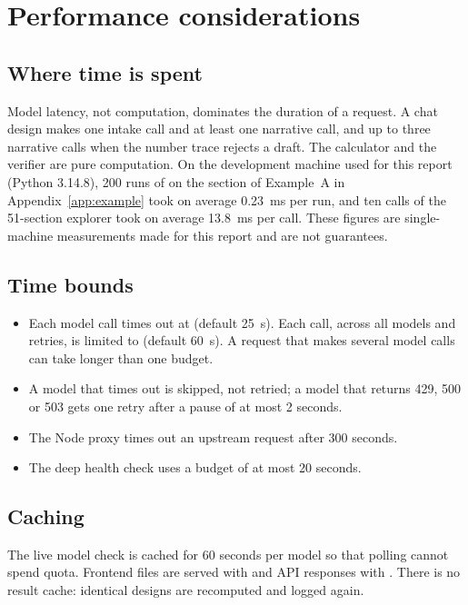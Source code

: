 \chapter{Performance considerations}\label{ch:perf}

\section{Where time is spent}
Model latency, not computation, dominates the duration of a request. A chat design makes one intake call and at least one narrative call, and up to three narrative calls when the number trace rejects a draft. The calculator and the verifier are pure computation. On the development machine used for this report (Python 3.14.8), 200 runs of  on the section of Example~A in Appendix~\ref{app:example} took on average 0.23~ms per run, and ten calls of the 51-section explorer took on average 13.8~ms per call. These figures are single-machine measurements made for this report and are not guarantees.

\section{Time bounds}
\begin{itemize}
  \item Each model call times out at  (default 25~s). Each  call, across all models and retries, is limited to  (default 60~s). A request that makes several model calls can take longer than one budget.
  \item A model that times out is skipped, not retried; a model that returns 429, 500 or 503 gets one retry after a pause of at most 2 seconds.
  \item The Node proxy times out an upstream request after 300 seconds.
  \item The deep health check uses a budget of at most 20 seconds.
\end{itemize}

\section{Caching}
The live model check is cached for 60 seconds per model so that polling cannot spend quota. Frontend files are served with  and API responses with . There is no result cache: identical designs are recomputed and logged again.

